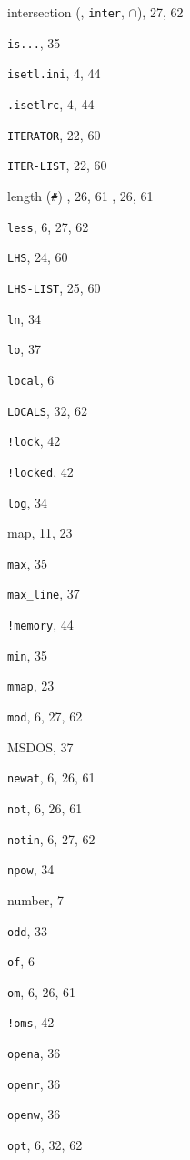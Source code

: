 \begin{theindex}
\item {intersection ({\tt *}, {\tt inter}, \(\cap\))}, 27, 62
\item {{\tt is...}}, 35
\item {{\tt isetl.ini}}, 4, 44
\item {{\tt .isetlrc}}, 4, 44
\item {{\tt ITERATOR}}, 22, 60
\item {{\tt ITER-LIST}}, 22, 60
\indexspace
\indexspace
\indexspace
\item {length ({\tt \#})}
	, 26, 61
	, 26, 61
\item {{\tt less}}, 6, 27, 62
\item {{\tt LHS}}, 24, 60
\item {{\tt LHS-LIST}}, 25, 60
\item {{\tt ln}}, 34
\item {{\tt lo}}, 37
\item {{\tt local}}, 6
\item {{\tt LOCALS}}, 32, 62
\item {{\tt !lock}}, 42
\item {{\tt !locked}}, 42
\item {{\tt log}}, 34
\indexspace
\item {map}, 11, 23
\item {{\tt max}}, 35
\item {{\tt max\_line}}, 37
\item {{\tt !memory}}, 44
\item {{\tt min}}, 35
\item {{\tt mmap}}, 23
\item {{\tt mod}}, 6, 27, 62
\item {MSDOS}, 37
\indexspace
\item {{\tt newat}}, 6, 26, 61
\item {{\tt not}}, 6, 26, 61
\item {{\tt notin}}, 6, 27, 62
\item {{\tt npow}}, 34
\item {number}, 7
\indexspace
\item {{\tt odd}}, 33
\item {{\tt of}}, 6
\item {{\tt om}}, 6, 26, 61
\item {{\tt !oms}}, 42
\item {{\tt opena}}, 36
\item {{\tt openr}}, 36
\item {{\tt openw}}, 36
\item {{\tt opt}}, 6, 32, 62

\end{theindex}
